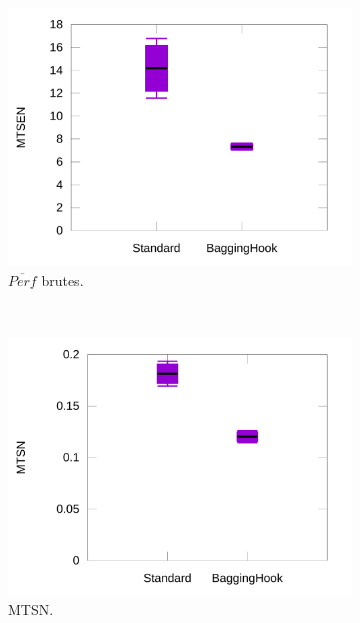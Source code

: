 \begin{figure}[htb]
\begin{subfigure}[t]{0.49\textwidth}
			\includegraphics[width=\textwidth]{figures/ch5/baggingRawProducts}
			\caption{$\overline{Perf}$ brutes.}
			\label{fig:baggingRawProducts}
		\end{subfigure}
		~
		\begin{subfigure}[t]{0.49\textwidth}
			\centering
			\includegraphics[width=\textwidth]{figures/ch5/baggingNormTimes}
			\caption{MTSN.}
			\label{fig:baggingNormTimes}
		\end{subfigure}
				~
		\begin{subfigure}[t]{0.49\textwidth}
			\centering

\end{subfigure}
\end{figure}
